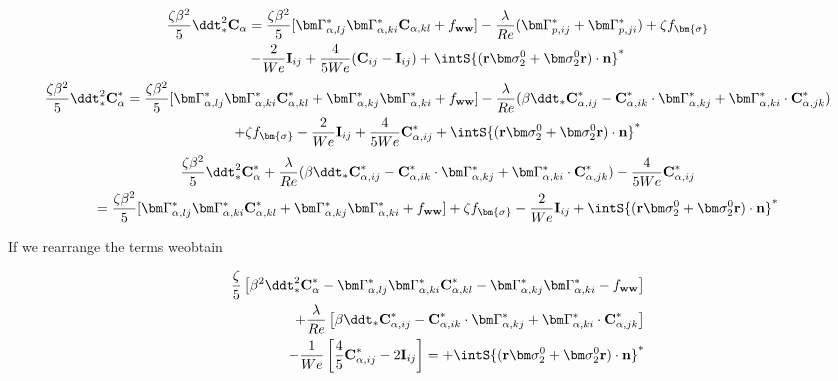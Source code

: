 \begin{multline}    
    \frac{\zeta \beta^2}{5}\ddt^2_* \textbf{C}_\alpha
    =  \frac{\zeta \beta^2}{5}[
    \bm\Gamma_{\alpha,lj}^* \bm\Gamma_{\alpha,ki}^* \textbf{C}_{\alpha,kl} + f_\textbf{ww}]
    - \frac{\lambda}{Re} (\bm \Gamma_{p,ij}^*+\bm \Gamma_{p,ji}^*)
    +\zeta f_{\bm{\sigma}}\\
        - \frac{2 }{We} \textbf{I}_{ij} 
        + \frac{4  }{5 We} (\textbf{C}_{ij} - \textbf{I}_{ij})
        +  \intS{(\textbf{r}\bm\sigma_2^0+ \bm\sigma_2^0\textbf{r})\cdot \textbf{n}}^*
\end{multline}
\begin{multline}    
    \frac{\zeta \beta^2}{5}\ddt^2_* \textbf{C}_\alpha^*
    =  \frac{\zeta \beta^2}{5}[
        \bm\Gamma_{\alpha,lj}^* \bm\Gamma_{\alpha,ki}^* \textbf{C}_{\alpha,kl}^* 
        + 
        \bm\Gamma_{\alpha,kj}^* \bm\Gamma_{\alpha,ki}^* 
        + f_\textbf{ww}]
    - \frac{\lambda}{Re} (
        \beta\ddt_* \textbf{C}_{\alpha,ij}^*
    - 
    \textbf{C}_{\alpha,ik}^* \cdot \bm\Gamma_{\alpha,kj}^*
    +  \bm\Gamma_{\alpha,ki}^* \cdot \textbf{C}_{\alpha,jk}^*
    )
    \\
    +\zeta f_{\bm{\sigma}}
        - \frac{2 }{We} \textbf{I}_{ij} 
        + \frac{4  }{5 We} \textbf{C}_{\alpha,ij}^*
        +  \intS{(\textbf{r}\bm\sigma_2^0+ \bm\sigma_2^0\textbf{r})\cdot \textbf{n}}^*
\end{multline}
\begin{multline}    
    \frac{\zeta \beta^2}{5}\ddt^2_* \textbf{C}_\alpha^*
    + \frac{\lambda}{Re} (
        \beta\ddt_* \textbf{C}_{\alpha,ij}^*
    - 
    \textbf{C}_{\alpha,ik}^* \cdot \bm\Gamma_{\alpha,kj}^*
    +  \bm\Gamma_{\alpha,ki}^* \cdot \textbf{C}_{\alpha,jk}^*
    )
    - \frac{4  }{5 We} \textbf{C}_{\alpha,ij}^*\\
    =  \frac{\zeta \beta^2}{5}[
        \bm\Gamma_{\alpha,lj}^* \bm\Gamma_{\alpha,ki}^* \textbf{C}_{\alpha,kl}^* 
        + 
        \bm\Gamma_{\alpha,kj}^* \bm\Gamma_{\alpha,ki}^* 
        + f_\textbf{ww}]
        +\zeta f_{\bm{\sigma}}
        - \frac{2 }{We} \textbf{I}_{ij} 
        +  \intS{(\textbf{r}\bm\sigma_2^0+ \bm\sigma_2^0\textbf{r})\cdot \textbf{n}}^*
\end{multline}


If we rearrange the terms weobtain 

\begin{align*}    
    \frac{\zeta}{5}\left[
        \beta^2\ddt^2_* \textbf{C}_\alpha^*
        - \bm\Gamma_{\alpha,lj}^* \bm\Gamma_{\alpha,ki}^* \textbf{C}_{\alpha,kl}^* 
        - \bm\Gamma_{\alpha,kj}^* \bm\Gamma_{\alpha,ki}^* 
        - f_\textbf{ww}
    \right]\\
    + \frac{\lambda}{Re} \left[
        \beta\ddt_* \textbf{C}_{\alpha,ij}^*
    - 
    \textbf{C}_{\alpha,ik}^* \cdot \bm\Gamma_{\alpha,kj}^*
    +  \bm\Gamma_{\alpha,ki}^* \cdot \textbf{C}_{\alpha,jk}^*
    \right]\\
    - \frac{1}{We}\left[
        \frac{4}{5}\textbf{C}_{\alpha,ij}^*
        - 2\textbf{I}_{ij}
    \right]
    = 
    +  \intS{(\textbf{r}\bm\sigma_2^0+ \bm\sigma_2^0\textbf{r})\cdot \textbf{n}}^*
\end{align*}
